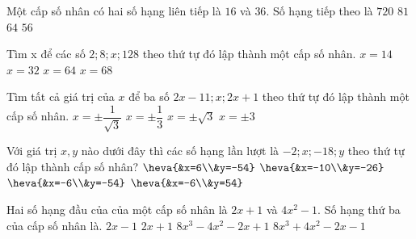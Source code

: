 \begin{ex}%
	Một cấp số nhân có hai số hạng liên tiếp là $16$ và $36$. Số hạng tiếp theo là
	\choice
	{$720$}
	{\True$81$}
	{$64$}
	{$56$}
\end{ex}
\begin{ex}%
	Tìm x để các số $2;8;x;128$ theo thứ tự đó lập thành một cấp số nhân.
	\choice
	{$x=14$}
	{\True
		$x=32$}
	{$x=64$}
	{$x=68$}
\end{ex}
\begin{ex}%
	Tìm tất cả giá trị của $x$ để ba số $2x-11;x;2x+1$ theo thứ tự đó lập thành một cấp số nhân.
	\choice
	{\True $x=\pm\dfrac{1}{\sqrt{3}}$}
	{$x=\pm\dfrac{1}{3}$}
	{$x=\pm\sqrt{3}$}
	{$x=\pm3$}
\end{ex}
\begin{ex}%
	Với giá trị $x,y$ nào dưới đây thì các số hạng lần lượt là $-2;x;-18;y$ theo thứ tự đó lập thành cấp số nhân?
	\choice
	{$\heva{&x=6\\&y=-54}$}
	{$\heva{&x=-10\\&y=-26}$}
	{\True $\heva{&x=-6\\&y=-54}$}
	{$\heva{&x=-6\\&y=54}$}
\end{ex}
\begin{ex}%
	Hai số hạng đầu của của một cấp số nhân là $2x+1$ và $4x^2-1$. Số hạng thứ ba của cấp số nhân là.
	\choice
	{$2x-1$}
	{$2x+1$}
	{\True $8x^3-4x^2-2x+1$}
	{$8x^3+4x^2-2x-1$}
\end{ex}

